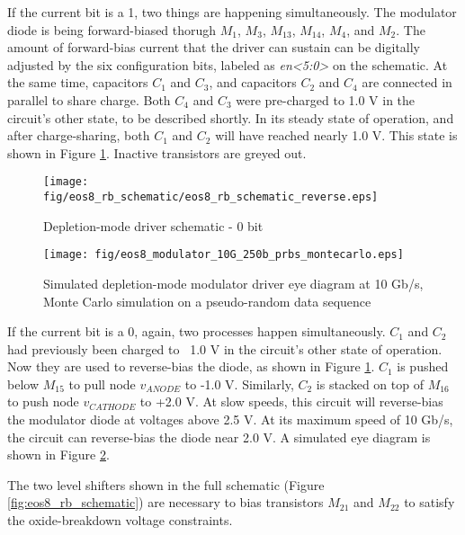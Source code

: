If the current bit is a 1, two things are happening simultaneously.  The modulator diode is being forward-biased thorugh $M_1$, $M_3$, $M_{13}$, $M_{14}$, $M_4$, and $M_2$.  The amount of forward-bias current that the driver can sustain can be digitally adjusted by the six configuration bits, labeled as \emph{en\textless5:0\textgreater} on the schematic.  At the same time, capacitors $C_1$ and $C_3$, and capacitors $C_2$ and $C_4$ are connected in parallel to share charge.  Both $C_4$ and $C_3$ were pre-charged to 1.0 V in the circuit's other state, to be described shortly.  In its steady state of operation, and after charge-sharing, both $C_1$ and $C_2$ will have reached nearly 1.0 V.  This state is shown in Figure \ref{fig:eos8_rb_schematic_reverse}.  Inactive transistors are greyed out.  


	\begin{figure}[H]
		\begin{center}
			\texttt{[image: fig/eos8\_rb\_schematic/eos8\_rb\_schematic\_reverse.eps]}
			\caption{\label{fig:eos8_rb_schematic_reverse}Depletion-mode driver schematic - 0 bit}
		\end{center}
	\end{figure}


	\begin{figure}[H]
		\begin{center}
			\texttt{[image: fig/eos8\_modulator\_10G\_250b\_prbs\_montecarlo.eps]}
			\caption{\label{fig:eos8_rb_eye}Simulated depletion-mode modulator driver eye diagram at 10 Gb/s, Monte Carlo simulation on a pseudo-random data sequence}
		\end{center}
	\end{figure}


If the current bit is a 0, again, two processes happen simultaneously.  $C_1$ and $C_2$ had previously been charged to ~1.0 V in the circuit's other state of operation.  Now they are used to reverse-bias the diode, as shown in Figure \ref{fig:eos8_rb_schematic_reverse}.  $C_1$ is pushed below $M_{15}$ to pull node $v_{ANODE}$ to -1.0 V.  Similarly, $C_2$ is stacked on top of $M_{16}$ to push node $v_{CATHODE}$ to +2.0 V.  At slow speeds, this circuit will reverse-bias the modulator diode at voltages above 2.5 V.  At its maximum speed of 10 Gb/s, the circuit can reverse-bias the diode near 2.0 V.  A simulated eye diagram is shown in Figure \ref{fig:eos8_rb_eye}.




The two level shifters shown in the full schematic (Figure \ref{fig:eos8_rb_schematic}) are necessary to bias transistors $M_{21}$ and $M_{22}$ to satisfy the oxide-breakdown voltage constraints.


